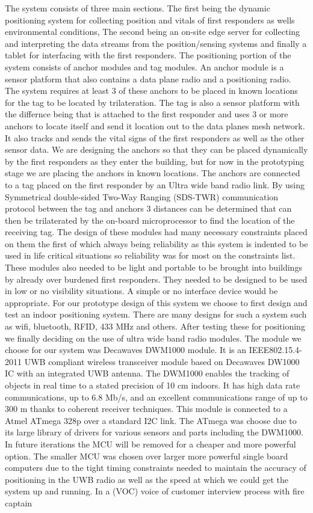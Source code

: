\documentclass[sigconf]{acmart}
\begin{document}
The system consists of three main sections. The first being the dynamic positioning system for collecting position and vitals of first responders as wells environmental conditions, The second being an on-site edge server for collecting and interpreting the data streams from the position/sensing systems and finally a tablet for interfacing with the first responders.
The positioning portion of the system consists of anchor modules and tag modules. An anchor module is a sensor platform that also contains a data plane radio and a positioning radio. The system requires at least 3 of these anchors to be placed in known locations for the tag to be located by trilateration. The tag is also a sensor platform with the differnce being that is attached to the first responder and uses 3 or more anchors to locate itself and send it location out to the data planes mesh network. It also tracks and sends the vital signs of the first responders as well as the other sensor data. We are designing the anchors so that they can be placed dynamically by the first responders as they enter the building, but for now in the prototyping stage we are placing the anchors in known locations. The anchors are connected to a tag placed on the first responder by an Ultra wide band radio link. By using Symmetrical double-sided Two-Way Ranging (SDS-TWR) communication protocol between the tag and anchors 3 distances can be determined that can then be trilaterated by the on-board microprocessor to find the location of the receiving tag. The design of these modules had many necessary constraints placed on them the first of which always being reliability as this system is indented to be used in life critical situations so reliability was for most on the constraints list. These modules also needed to be light and portable to be brought into buildings by already over burdened first responders. They needed to be designed to be used in low or no visibility situations. A simple or no interface device would be appropriate. For our prototype design of this system we choose to first design and test an indoor positioning system. There are many designs for such a system such as wifi, bluetooth, RFID, 433 MHz and others. After testing these for positioning we finally deciding on the use of ultra wide band radio modules. The module we choose for our system was Decawaves DWM1000 module. It is an IEEE802.15.4-2011 UWB compliant wireless transceiver module based on Decawaves DW1000 IC with an integrated UWB antenna. The DWM1000 enables the tracking of objects in real time to a stated precision of 10 cm indoors. It has high data rate communications, up to 6.8 Mb/s, and an excellent communications range of up to 300 m thanks to coherent receiver techniques. This module is connected to a Atmel ATmega 328p over a standard I2C link. The ATmega was choose due to its large library of drivers for various sensors and parts including the DWM1000. In future iterations the MCU will be removed for a cheaper and more powerful option. The smaller MCU was chosen over larger more powerful single board computers due to the tight timing constraints needed to maintain the accuracy of positioning in the UWB radio as well as the speed at which we could get the system up and running. In a (VOC) voice of customer interview process with fire captain 
\end{document}
